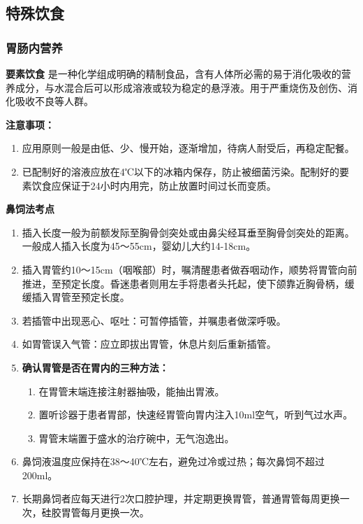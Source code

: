 \documentclass[11pt, a4paper]{ctexart}
\begin{document}
\subsection{特殊饮食}
\subsubsection{胃肠内营养}
\textbf{要素饮食}
是一种化学组成明确的精制食品，含有人体所必需的易于消化吸收的营养成分，与水混合后可以形成溶液或较为稳定的悬浮液。用于严重烧伤及创伤、消化吸收不良等人群。

\textbf{注意事项：}
\begin{enumerate}
    \item 应用原则一般是由低、少、慢开始，逐渐增加，待病人耐受后，再稳定配餐。
    \item 已配制好的溶液应放在4℃以下的冰箱内保存，防止被细菌污染。配制好的要素饮食应保证于24小时内用完，防止放置时间过长而变质。
\end{enumerate}

\textbf{鼻饲法考点}
\begin{enumerate}
    \item 插入长度一般为前额发际至胸骨剑突处或由鼻尖经耳垂至胸骨剑突处的距离。一般成人插入长度为45～55cm，婴幼儿大约14-18cm。
    \item 插入胃管约10～15cm（咽喉部）时，嘱清醒患者做吞咽动作，顺势将胃管向前推进，至预定长度。昏迷患者则用左手将患者头托起，使下颌靠近胸骨柄，缓缓插入胃管至预定长度。
    \item 若插管中出现恶心、呕吐：可暂停插管，并嘱患者做深呼吸。
    \item 如胃管误入气管：应立即拔出胃管，休息片刻后重新插管。
    \item \textbf{确认胃管是否在胃内的三种方法：}
    \begin{enumerate}
        \item 在胃管末端连接注射器抽吸，能抽出胃液。
        \item 置听诊器于患者胃部，快速经胃管向胃内注入10ml空气，听到气过水声。
        \item 胃管末端置于盛水的治疗碗中，无气泡逸出。
    \end{enumerate}
    \item 鼻饲液温度应保持在38～40℃左右，避免过冷或过热；每次鼻饲不超过200ml。
    \item 长期鼻饲者应每天进行2次口腔护理，并定期更换胃管，普通胃管每周更换一次，硅胶胃管每月更换一次。
\end{enumerate}
\end{document}
